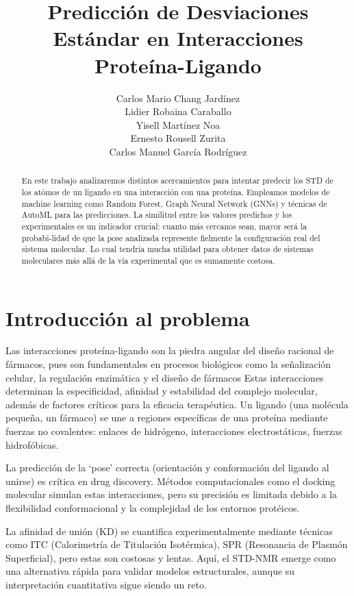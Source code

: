 \documentclass{article}
\title{Predicción de Desviaciones Estándar en Interacciones Proteína-Ligando}
\author{Carlos Mario Chang Jardínez\\Lidier Robaina Caraballo\\Yisell Martínez Noa\\Ernesto Rousell Zurita\\Carlos Manuel García Rodríguez}
\begin{document}
\maketitle

\begin{abstract}
    En este trabajo analizaremos distintos acercamientos para intentar predecir los STD de los atómos de un ligando en una interacción con una proteína.
    Empleamos modelos de machine learning como Random Forest, Graph Neural Network (GNNs) y técnicas de AutoML para las predicciones. La similitud entre
    los valores predichos y los experimentales es un indicador crucial: cuanto más cercanos sean, mayor será la probabi-lidad de que la pose analizada
    represente fielmente la configuración real del sistema molecular. Lo cual tendría mucha utilidad para obtener datos de sistemas moleculares más allá de
    la vía experimental que es sumamente costosa.
\end{abstract}

\newpage

\section{Introducción al problema}
Las interacciones proteína-ligando son la piedra angular del diseño racional de fármacos, pues son fundamentales en procesos biológicos como la señalización celular,
la regulación enzimática y el diseño de fármacos Estas interacciones determinan la especificidad, afinidad y estabilidad del complejo molecular, además de factores críticos
para la eficacia terapéutica. Un ligando (una molécula pequeña, un fármaco) se une a regiones específicas de una proteína mediante fuerzas no covalentes:
enlaces de hidrógeno, interacciones electrostáticas, fuerzas hidrofóbicas.

La predicción de la `pose' correcta (orientación y conformación del ligando al unirse) es crítica en drug discovery. Métodos computacionales como el docking
molecular simulan estas interacciones, pero su precisión es limitada debido a la flexibilidad conformacional y la complejidad de los entornos protéicos\cite{docking}.

La afinidad de unión (KD) se cuantifica experimentalmente mediante técnicas como ITC (Calorimetría de Titulación Isotérmica), SPR (Resonancia de Plasmón Superficial),
pero estas son costosas y lentas. Aquí, el STD-NMR emerge como una alternativa rápida para validar modelos estructurales, aunque su interpretación cuantitativa sigue
siendo un reto\cite{STD_e}.
\end{document}
